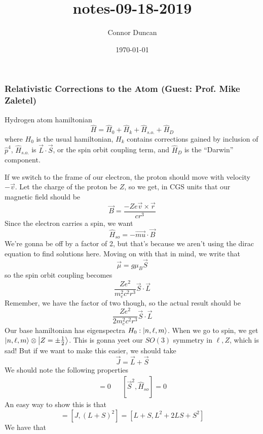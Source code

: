 \documentclass{article}
\author{Connor Duncan}
\date{\today}
\title{notes-09-18-2019}
\theoremstyle{definition}
\begin{document}
\subsubsection{Relativistic Corrections to the Atom (Guest: Prof. Mike Zaletel)} Hydrogen atom hamiltonian \begin{equation} \hat H=\hat H_0+\hat H_k+\hat H_{s.o.}+\hat H_D \end{equation} where $H_0$ is the usual hamiltonian, $H_k$ contains corrections gained by inclusion of $\hat p^4$, $\hat H_{s.o.}$ is $\vec{L}\cdot\vec{S}$, or the spin orbit coupling term, and $\hat H_D$ is the ``Darwin'' component. \begin{center}  \end{center} If we switch to the frame of our electron, the proton should move with velocity $-\vec{v}$. Let the charge of the proton be $Z$, so we get, in CGS units that our magnetic field should be \begin{equation} \vec{B}=\frac{-Ze\vec{v}\times\vec{r}}{cr^3} \end{equation} Since the electron carries a spin, we want \begin{equation} \hat H_{so}=-\vec{mu}\cdot\vec{B} \end{equation} We're gonna be off by a factor of 2, but that's because we aren't using the dirac equation to find solutions here. Moving on with that in mind, we write that \begin{equation} \vec{\mu}=g\mu_B\vec{S} \end{equation} so the spin orbit coupling becomes \begin{equation} \frac{Ze^2}{m_e^2c^2r^3}\vec{S}\cdot\vec{L} \end{equation} Remember, we have the factor of two though, so the actual result should be \begin{equation} \frac{Ze^2}{2m_e^2c^2r^3}\vec{S}\cdot\vec{L} \end{equation} Our base hamiltonian has eigenspectra $H_0:\ket{n,\ell,m}$. When we go to spin, we get $\ket{n,\ell,m}\otimes\ket{Z=\pm\frac{1}{2}}$. This is gonna yeet our $SO(3)$ symmetry in $\ell,Z$, which is sad! But if we want to make this easier, we should take \begin{equation} \vec{J}=\vec{L}+\vec{S} \end{equation} We should note the following properties \begin{align} [\vec{L}^2,\hat H_{so}]=0 && [\vec{S}^2,\hat H_{so}]=0 \end{align} An easy way to show this is that \begin{equation} [J,J^2]=[J,(L+S)^2]=[L+S,L^2+2LS+S^2] \end{equation} We have that 
\end{document}
